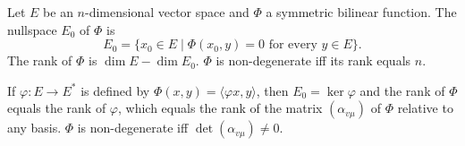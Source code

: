 Let $E$ be an $n$-dimensional vector space and $\Phi$ a symmetric bilinear function. The nullspace $E_0$ of $\Phi$ is
$$E_0 = \{x_0 \in E \mid \Phi(x_0, y) = 0 \text{ for every } y \in E\}.$$
The rank of $\Phi$ is $\dim E - \dim E_0$. $\Phi$ is non-degenerate iff its rank equals $n$.

If $\varphi: E \to E^*$ is defined by $\Phi(x, y) = \langle \varphi x, y \rangle$, then $E_0 = \ker \varphi$ and the rank of $\Phi$ equals the rank of $\varphi$, which equals the rank of the matrix $(\alpha_{v\mu})$ of $\Phi$ relative to any basis. $\Phi$ is non-degenerate iff $\det(\alpha_{v\mu}) \neq 0$.
